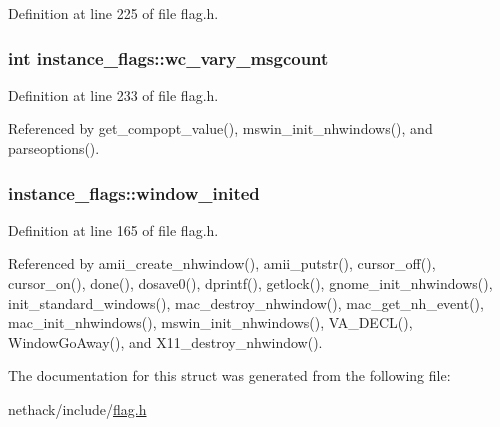 Definition at line 225 of file flag.\+h.

\hypertarget{structinstance__flags_a5dae0b9030e73537ec058bfb1b5f0291}{
\subsubsection[{wc\+\_\+vary\+\_\+msgcount}]{\setlength{\rightskip}{0pt plus 5cm}int instance\+\_\+flags\+::wc\+\_\+vary\+\_\+msgcount}}\label{structinstance__flags_a5dae0b9030e73537ec058bfb1b5f0291}


Definition at line 233 of file flag.\+h.



Referenced by get\+\_\+compopt\+\_\+value(), mswin\+\_\+init\+\_\+nhwindows(), and parseoptions().

\hypertarget{structinstance__flags_a2fc6c78c4c5f6e1d0027ac575135426f}{
\subsubsection[{window\+\_\+inited}]{ instance\+\_\+flags\+::window\+\_\+inited}}\label{structinstance__flags_a2fc6c78c4c5f6e1d0027ac575135426f}


Definition at line 165 of file flag.\+h.



Referenced by amii\+\_\+create\+\_\+nhwindow(), amii\+\_\+putstr(), cursor\+\_\+off(), cursor\+\_\+on(), done(), dosave0(), dprintf(), getlock(), gnome\+\_\+init\+\_\+nhwindows(), init\+\_\+standard\+\_\+windows(), mac\+\_\+destroy\+\_\+nhwindow(), mac\+\_\+get\+\_\+nh\+\_\+event(), mac\+\_\+init\+\_\+nhwindows(), mswin\+\_\+init\+\_\+nhwindows(), V\+A\+\_\+\+D\+E\+C\+L(), Window\+Go\+Away(), and X11\+\_\+destroy\+\_\+nhwindow().



The documentation for this struct was generated from the following file\+:\begin{DoxyCompactItemize}
\item 
nethack/include/\hyperlink{flag_8h}{flag.\+h}\end{DoxyCompactItemize}

